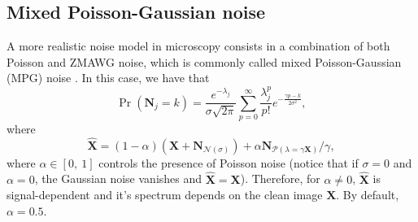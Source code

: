 \documentclass{article}
\begin{document}
\subsection{Mixed Poisson-Gaussian noise}
A more realistic noise model in microscopy consists in a combination
of both Poisson and ZMAWG noise, which is commonly called mixed
Poisson-Gaussian (MPG) noise \cite{meiniel2018denoising}. In this
case, we have that
\begin{equation}
  \Pr({\mathbf N}_j{=}k) = \frac{e^{-\lambda_j}}{\sigma\sqrt{2\pi}}\sum_{p=0}^{\infty}\frac{\lambda_j^p}{p!} e^{-\frac{\gamma p - k}{2\sigma^2}},
  \label{eq:PN}
\end{equation}
where
\begin{equation}
  \hat{\mathbf X} = (1-\alpha)(\mathbf{X} + {\mathbf N}_{\mathcal{N}(\sigma)}) + \alpha{\mathbf N}_{\mathcal{P}(\lambda=\gamma\mathbf{X})}/\gamma,
  \label{eq:MPG_noise_model} 
\end{equation}
where $\alpha\in[0,~1]$ controls the presence of Poisson noise (notice
that if $\sigma=0$ and $\alpha=0$, the Gaussian noise vanishes and
$\hat{\mathbf{X}}=\mathbf{X}$).  Therefore, for $\alpha\neq 0$,
$\hat{\mathbf{X}}$ is signal-dependent and it's spectrum depends on
the clean image $\mathbf{X}$. By default, $\alpha=0.5$.


  
\end{document}

